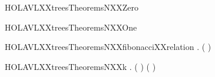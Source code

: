 \newcommand{\HOLAVLXXtreesTheoremsminimalXXavlXXnodeXXcount}{\UseVerbatim{HOLAVLXXtreesTheoremsminimalXXavlXXnodeXXcount}}
\begin{SaveVerbatim}{HOLAVLXXtreesTheoremsNXXZero}
\HOLTokenTurnstile{}   \HOLSymConst{=} 
\end{SaveVerbatim}
\newcommand{\HOLAVLXXtreesTheoremsNXXZero}{\UseVerbatim{HOLAVLXXtreesTheoremsNXXZero}}
\begin{SaveVerbatim}{HOLAVLXXtreesTheoremsNXXOne}
\HOLTokenTurnstile{}   \HOLSymConst{=} 
\end{SaveVerbatim}
\newcommand{\HOLAVLXXtreesTheoremsNXXOne}{\UseVerbatim{HOLAVLXXtreesTheoremsNXXOne}}
\begin{SaveVerbatim}{HOLAVLXXtreesTheoremsNXXfibonacciXXrelation}
\HOLTokenTurnstile{} \HOLSymConst{\HOLTokenForall{}}.   \HOLSymConst{=}  ( \HOLSymConst{\ensuremath{+}} ) \HOLSymConst{\ensuremath{-}} 
\end{SaveVerbatim}
\newcommand{\HOLAVLXXtreesTheoremsNXXfibonacciXXrelation}{\UseVerbatim{HOLAVLXXtreesTheoremsNXXfibonacciXXrelation}}
\begin{SaveVerbatim}{HOLAVLXXtreesTheoremsNXXk}
\HOLTokenTurnstile{} \HOLSymConst{\HOLTokenForall{}}.  ( \HOLSymConst{\ensuremath{+}} ) \HOLSymConst{=}  ( \HOLSymConst{\ensuremath{+}} ) \HOLSymConst{\ensuremath{+}}   \HOLSymConst{\ensuremath{+}} 
\end{SaveVerbatim}
\newcommand{\HOLAVLXXtreesTheoremsNXXk}{\UseVerbatim{HOLAVLXXtreesTheoremsNXXk}}

